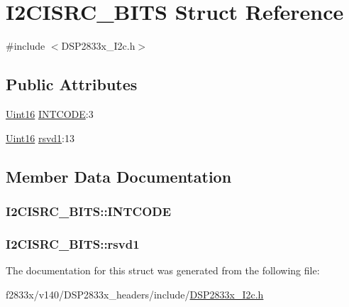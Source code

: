 \hypertarget{struct_i2_c_i_s_r_c___b_i_t_s}{}\section{I2\+C\+I\+S\+R\+C\+\_\+\+B\+I\+T\+S Struct Reference}
\label{struct_i2_c_i_s_r_c___b_i_t_s}


{\ttfamily \#include $<$D\+S\+P2833x\+\_\+\+I2c.\+h$>$}

\subsection*{Public Attributes}
\begin{DoxyCompactItemize}
\item 
\hyperlink{_d_s_p2833x___device_8h_a59a9f6be4562c327cbfb4f7e8e18f08b}{Uint16} \hyperlink{struct_i2_c_i_s_r_c___b_i_t_s_a42de2c1224d9b2bacd959ad788ba50bc}{I\+N\+T\+C\+O\+D\+E}\+:3
\item 
\hyperlink{_d_s_p2833x___device_8h_a59a9f6be4562c327cbfb4f7e8e18f08b}{Uint16} \hyperlink{struct_i2_c_i_s_r_c___b_i_t_s_adbf4bb738ba1e104d07a4b63ed2da821}{rsvd1}\+:13
\end{DoxyCompactItemize}


\subsection{Member Data Documentation}
\hypertarget{struct_i2_c_i_s_r_c___b_i_t_s_a42de2c1224d9b2bacd959ad788ba50bc}{}
\subsubsection[{I\+N\+T\+C\+O\+D\+E}]{ I2\+C\+I\+S\+R\+C\+\_\+\+B\+I\+T\+S\+::\+I\+N\+T\+C\+O\+D\+E}\label{struct_i2_c_i_s_r_c___b_i_t_s_a42de2c1224d9b2bacd959ad788ba50bc}
\hypertarget{struct_i2_c_i_s_r_c___b_i_t_s_adbf4bb738ba1e104d07a4b63ed2da821}{}
\subsubsection[{rsvd1}]{ I2\+C\+I\+S\+R\+C\+\_\+\+B\+I\+T\+S\+::rsvd1}\label{struct_i2_c_i_s_r_c___b_i_t_s_adbf4bb738ba1e104d07a4b63ed2da821}


The documentation for this struct was generated from the following file\+:\begin{DoxyCompactItemize}
\item 
f2833x/v140/\+D\+S\+P2833x\+\_\+headers/include/\hyperlink{_d_s_p2833x___i2c_8h}{D\+S\+P2833x\+\_\+\+I2c.\+h}\end{DoxyCompactItemize}
